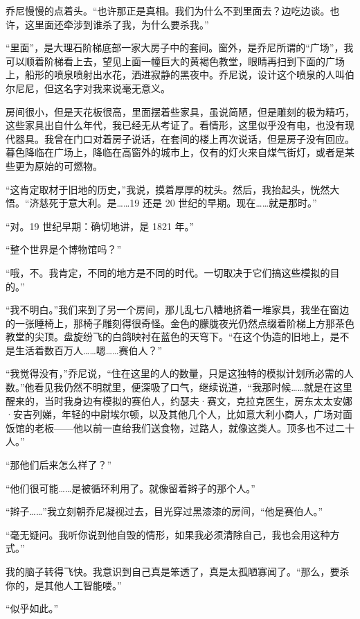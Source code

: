 \documentclass[AutoFakeBold=true]{book}
\begin{document}
乔尼慢慢的点着头。``也许那正是真相。我们为什么不到里面去？边吃边谈。也许，这里面还牵涉到谁杀了我，为什么要杀我。''

\vspace*{1em}

``里面''，是大理石阶梯底部一家大房子中的套间。窗外，是乔尼所谓的``广场''，我可以顺着阶梯看上去，望见上面一幢巨大的黄褐色教堂，眼睛再扫到下面的广场上，船形的喷泉喷射出水花，洒进寂静的黑夜中。乔尼说，设计这个喷泉的人叫伯尔尼尼，但这名字对我来说毫无意义。

房间很小，但是天花板很高，里面摆着些家具，虽说简陋，但是雕刻的极为精巧，这些家具出自什么年代，我已经无从考证了。看情形，这里似乎没有电，也没有现代器具。我曾在门口对着房子说话，在套间的楼上再次说话，但是房子没有回应。暮色降临在广场上，降临在高窗外的城市上，仅有的灯火来自煤气街灯，或者是某些更为原始的可燃物。

``这肯定取材于旧地的历史，''我说，摸着厚厚的枕头。然后，我抬起头，恍然大悟。``济慈死于意大利。是……19 还是 20 世纪的早期。现在……就是那时。''

``对。19 世纪早期：确切地讲，是 1821 年。''

``整个世界是个博物馆吗？''

``哦，不。我肯定，不同的地方是不同的时代。一切取决于它们搞这些模拟的目的。''

``我不明白。''我们来到了另一个房间，那儿乱七八糟地挤着一堆家具，我坐在窗边的一张睡椅上，那椅子雕刻得很奇怪。金色的朦胧夜光仍然点缀着阶梯上方那茶色教堂的尖顶。盘旋纷飞的白鸽映衬在蓝色的天穹下。``在这个伪造的旧地上，是不是生活着数百万人……嗯……赛伯人？''

``我觉得没有，''乔尼说，``住在这里的人的数量，只是这独特的模拟计划所必需的人数。''他看见我仍然不明就里，便深吸了口气，继续说道，``我那时候……就是在这里醒来的，当时我身边有模拟的赛伯人，约瑟夫·赛文，克拉克医生，房东太太安娜·安吉列娣，年轻的中尉埃尔顿，以及其他几个人，比如意大利小商人，广场对面饭馆的老板——他以前一直给我们送食物，过路人，就像这类人。顶多也不过二十人。''

``那他们后来怎么样了？''

``他们很可能……是被循环利用了。就像留着辫子的那个人。''

``辫子……''我立刻朝乔尼凝视过去，目光穿过黑漆漆的房间，``他是赛伯人。''

``毫无疑问。我听你说到他自毁的情形，如果我必须清除自己，我也会用这种方式。''

我的脑子转得飞快。我意识到自己真是笨透了，真是太孤陋寡闻了。``那么，要杀你的，是其他人工智能喽。''

``似乎如此。''
\end{document}
